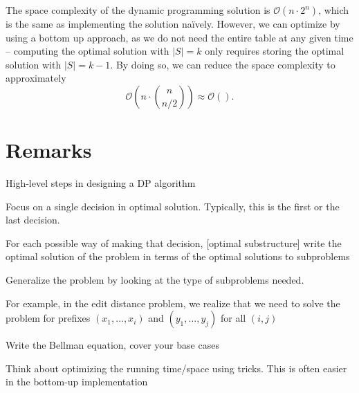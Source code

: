 The space complexity of the dynamic programming solution is $\mathcal{O}(n \cdot 2^n)$, which is the same as implementing the solution na\"ively. However, we can optimize by using a bottom up approach, as we do not need the entire table at any given time -- computing the optimal solution with $|S| = k$ only requires storing the optimal solution with $|S| = k - 1$. By doing so, we can reduce the space complexity to approximately \[
    \mathcal{O} \left( n \cdot \binom{n}{n/2} \right) \approx \mathcal{O} \left(  \right).
\]

\section{Remarks}

High-level steps in designing a DP algorithm
\begin{listu}
    \item Focus on a single decision in optimal solution. Typically, this is the first or the last decision. 

    \item For each possible way of making that decision, [optimal substructure] write the optimal solution of the problem in terms of the optimal solutions to subproblems

    \item Generalize the problem by looking at the type of subproblems needed. 
    
    For example, in the edit distance problem, we realize that we need to solve the problem for prefixes $(x_1, \dots, x_i)$ and $(y_1, \dots , y_j)$ for all $(i,j)$

    \item Write the Bellman equation, cover your base cases 

    \item Think about optimizing the running time/space using tricks. This is often easier in the bottom-up implementation
\end{listu}
